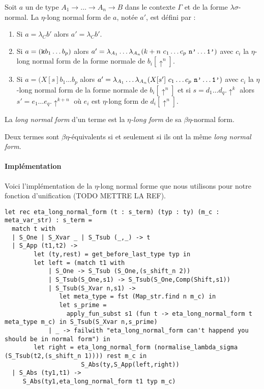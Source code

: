 \begin{defn}
Soit $a$ un \lsterm{} de type $A_1 \xrightarrow{} \dots \xrightarrow{} A_n \xrightarrow{} B$ dans le contexte $\Gamma$ et de la forme $\lambda\sigma$-normal. La $\eta$-long normal form de $a$, notée $a'$, est défini par :
\begin{enumerate}
    \item Si $a = \lambda_Cb'$ alors $a' = \lambda_Cb'$.
    \item Si $a = (\verb?k?b_1\dots b_p)$ alors $a' = \lambda_{A_1} \dots \lambda_{A_n}(k+n\ c_1\dots c_p\  \verb?n'?\dots \verb?1'?)$ avec $c_i$ la $\eta$-long normal form de la forme normale de $b_i[\uparrow^n]$.
    \item Si $a = (X[s]b_1\dots b_p$ alors $a' = \lambda_{A_1}\dots \lambda_{A_n}(X[s']\ c_1\dots c_p\ \verb?n'?\dots \verb?1'?)$ avec $c_i$ la $\eta$-long normal form de la forme normale de $b_i[\uparrow^n]$ et si $s = d_1\dots d_q.\uparrow^k$ alors $s' = e_1\dots e_q.\uparrow^{k+n}$ où $e_i$ est $\eta$-long form de $d_i[\uparrow^n]$.
\end{enumerate}


\begin{defn}
La \textit{long normal form} d'un terme est la \textit{$\eta$-long form} de sa $\beta\eta$-normal form.
\end{defn}

\begin{prop}
Deux termes sont $\beta\eta$-équivalents si et seulement si ils ont la même \textit{long normal form}. 
\end{prop}

\paragraph{Implémentation}

Voici l'implémentation de la $\eta$-long normal forme que nous utilisons pour notre fonction d'unification (TODO METTRE LA REF).

\begin{lstlisting}
let rec eta_long_normal_form (t : s_term) (typ : ty) (m_c : meta_var_str) : s_term =
  match t with
  | S_One | S_Xvar _ | S_Tsub (_,_) -> t
  | S_App (t1,t2) -> 
        let (ty,rest) = get_before_last_type typ in
        let left = (match t1 with
            | S_One -> S_Tsub (S_One,(s_shift_n 2))
            | S_Tsub(S_One,s1) -> S_Tsub(S_One,Comp(Shift,s1))
            | S_Tsub(S_Xvar n,s1) ->
               let meta_type = fst (Map_str.find n m_c) in 
               let s_prime = 
                 apply_fun_subst s1 (fun t -> eta_long_normal_form t meta_type m_c) in S_Tsub(S_Xvar n,s_prime)
            | _ -> failwith "eta_long_normal_form can't happend you should be in normal form") in
        let right = eta_long_normal_form (normalise_lambda_sigma (S_Tsub(t2,(s_shift_n 1)))) rest m_c in 
                     S_Abs(ty,S_App(left,right))
  | S_Abs (ty1,t1) ->
     S_Abs(ty1,eta_long_normal_form t1 typ m_c)
\end{lstlisting}


\end{defn}
